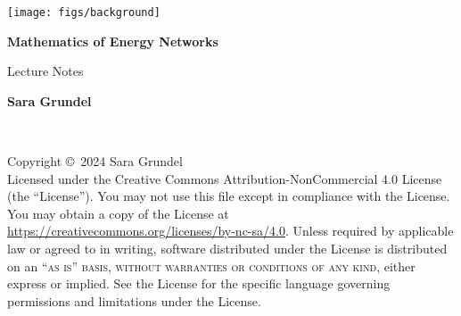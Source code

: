 \documentclass[
	11pt, %
	fleqn, %
	a4paper, %
]{LegrandOrangeBook}
\begin{document}

\titlepage %
	{\texttt{[image: figs/background]}} %
	{ %
		\centering\sffamily %
		{\Huge\bfseries Mathematics of Energy Networks\par} %
		\vspace{16pt} %
		{\LARGE Lecture Notes\par} %
		\vspace{24pt} %
		{\huge\bfseries Sara Grundel\par} %
	}


\thispagestyle{empty} %

~\vfill %

\noindent Copyright \copyright\ 2024 Sara Grundel\\ %



\noindent Licensed under the Creative Commons Attribution-NonCommercial 4.0 License (the ``License''). You may not use this file except in compliance with the License. You may obtain a copy of the License at \url{https://creativecommons.org/licenses/by-nc-sa/4.0}. Unless required by applicable law or agreed to in writing, software distributed under the License is distributed on an \textsc{``as is'' basis, without warranties or conditions of any kind}, either express or implied. See the License for the specific language governing permissions and limitations under the License.\\ %
\end{document}

